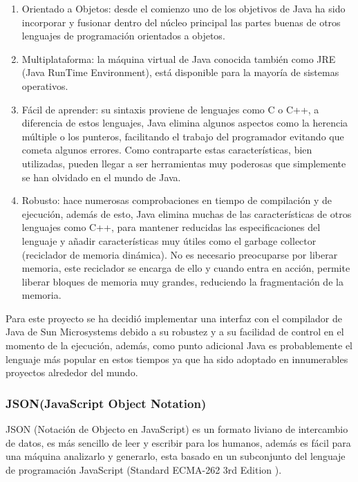 \begin{enumerate}
	
	\item Orientado a Objetos: desde el comienzo uno de los objetivos de Java ha sido incorporar y fusionar dentro del núcleo principal las partes buenas de otros lenguajes de programación orientados a objetos.
	
	\item Multiplataforma: la máquina virtual de Java conocida también como JRE (Java RunTime Environment), está disponible para la mayoría de sistemas operativos.
	
	\item Fácil de aprender: su sintaxis proviene de lenguajes como C o C++, a diferencia de estos lenguajes, Java elimina algunos aspectos como la herencia múltiple o los punteros, facilitando el trabajo del programador evitando que cometa algunos errores. Como contraparte estas características, bien utilizadas, pueden llegar a ser herramientas muy poderosas que simplemente se han olvidado en el mundo de Java.
	
	\item Robusto: hace numerosas comprobaciones en tiempo de compilación y de ejecución, además de esto, Java elimina muchas de las características de otros lenguajes como C++, para mantener reducidas las especificaciones del lenguaje y añadir características muy útiles como el garbage collector (reciclador de memoria dinámica). No es necesario preocuparse por liberar memoria, este reciclador se encarga de ello y cuando entra en acción, permite liberar bloques de memoria muy grandes, reduciendo la fragmentación de la memoria.
	
\end{enumerate}

Para este proyecto se ha decidió implementar una interfaz con el compilador de Java de Sun Microsystems debido a su robustez y a su facilidad de control en el momento de la ejecución, además, como punto adicional Java es probablemente el lenguaje más popular en estos tiempos ya que ha sido adoptado en innumerables proyectos alrededor del mundo.


\subsubsection*{JSON(JavaScript Object Notation) \cite{json} }
\label{tec:json}

JSON (Notación de Objecto en JavaScript) es un formato liviano de intercambio de datos, es más sencillo de leer y escribir para los humanos, además es fácil para una máquina analizarlo y generarlo, esta basado en un subconjunto del lenguaje de programación JavaScript (Standard ECMA-262 3rd Edition \cite{json_ecma}).


